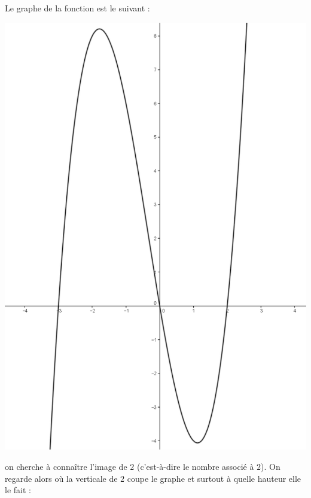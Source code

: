 \begin{exemple}
Le graphe de la fonction est le suivant :
\begin{center}
\includegraphics{affines/fct_graphe.png}
\end{center}
on cherche à connaître l'image de $2$ (c'est-à-dire le nombre associé à $2$). On regarde alors où la verticale de $2$ coupe le graphe et surtout à quelle hauteur elle le fait :
\begin{center}

\end{center}
\end{exemple}
